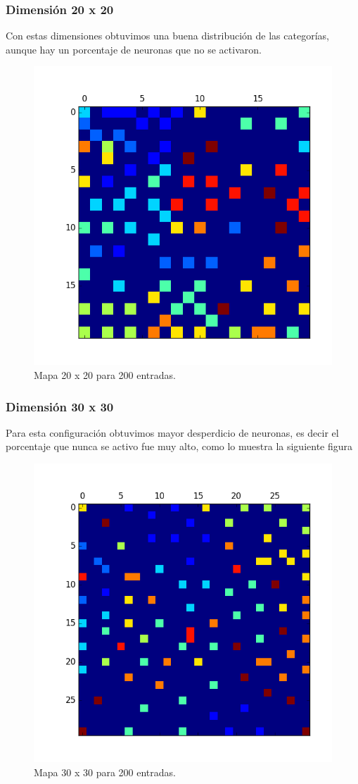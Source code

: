 \subsubsection{Dimensión 20 x 20 }

Con estas dimensiones obtuvimos una buena distribución de las categorías,
aunque hay un porcentaje de neuronas que no se activaron.

\begin{figure}[H]
  \centering
  \includegraphics[width=0.5\columnwidth]{secciones/graficos/kohonen/mapa2020.png}
  \caption{Mapa 20 x 20 para 200 entradas.}
  \label{fig:mapa 20 20 200}
\end{figure}


\subsubsection{Dimensión 30 x 30 }

Para esta configuración obtuvimos mayor desperdicio de neuronas,
es decir el porcentaje que nunca se activo fue muy alto, como lo muestra
la siguiente figura

\begin{figure}[H]
  \centering
  \includegraphics[width=0.5\columnwidth]{secciones/graficos/kohonen/mapa3030.png}
  \caption{Mapa 30 x 30 para 200 entradas.}
  \label{fig:mapa 30 30 200}
\end{figure}


